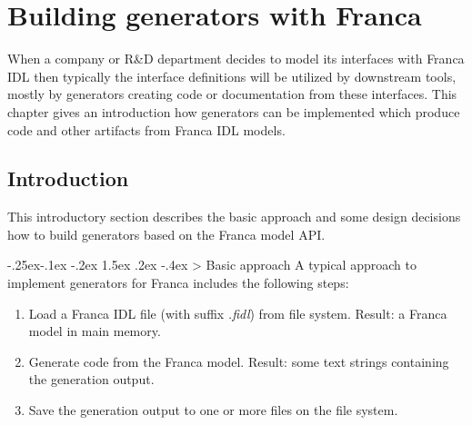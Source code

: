 \documentclass[a4paper,10pt]{scrreprt}
\makeatletter
\renewcommand\subsection{\medskip\@startsection{subsection}{2}{\z@}%
  {-.25ex\@plus -.1ex \@minus -.2ex}%
  {1.5ex \@plus .2ex \@minus -.4ex}%
  {\ifnum \scr@compatibility>\@nameuse{scr@v@2.96}\relax
    \setlength{\parfillskip}{\z@ plus 1fil}\fi
    \raggedsection\normalfont\sectfont\nobreak\size@subsection
  }%
}
\newlength{\XdocItemIndent}
\makeatother
\begin{document}
\chapter{Building generators with Franca}
\label{BuildingGenerators}
When a company or R\&D department decides to model its interfaces
with Franca IDL then typically the interface definitions will be
utilized by downstream tools, mostly by generators creating code
or documentation from these interfaces.
This chapter gives an introduction how generators can be implemented 
which produce code and other artifacts from Franca IDL models.

\section{Introduction}
\label{BuildingGenerators_Introduction}
This introductory section describes the basic approach and some design 
decisions how to build generators based on the Franca model API.  

\subsection{Basic approach}
\label{BuildingGenerators_Introduction_Approach}
A typical approach to implement generators for Franca includes the
following steps:

\setlength{\XdocItemIndent}{\textwidth}
\begin{enumerate}
\addtolength{\XdocItemIndent}{-2.5em}
\item \begin{minipage}[t]{\XdocItemIndent}
Load a Franca IDL file (with suffix \textit{.fidl}) from file system.
         Result: a Franca model in main memory.

\end{minipage}
\item \begin{minipage}[t]{\XdocItemIndent}
Generate code from the Franca model.
         Result: some text strings containing the generation output.

\end{minipage}
\item \begin{minipage}[t]{\XdocItemIndent}
Save the generation output to one or more files on the file system.

\end{minipage}
\end{enumerate}
\addtolength{\XdocItemIndent}{2.5em}
\end{document}
